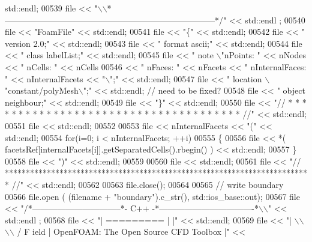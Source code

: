 \begin{DoxyCode}
      std::endl;
00539     file << \textcolor{stringliteral}{"\(\backslash\)\(\backslash\)*---------------------------------------------------------------------------*/"} << std::endl
      ;
00540     file << \textcolor{stringliteral}{"FoamFile"} << std::endl;
00541     file << \textcolor{stringliteral}{"\{"} << std::endl;
00542     file << \textcolor{stringliteral}{"    version     2.0;"} << std::endl;
00543     file << \textcolor{stringliteral}{"    format      ascii;"} << std::endl;
00544     file << \textcolor{stringliteral}{"    class       labelList;"} << std::endl;
00545     file << \textcolor{stringliteral}{"    note        \(\backslash\)"nPoints: "} << nNodes << \textcolor{stringliteral}{" nCells: "} << nCells
00546          << \textcolor{stringliteral}{" nFaces: "} << nFacets << \textcolor{stringliteral}{" nInternalFaces: "} << nInternalFacets << \textcolor{stringliteral}{"\(\backslash\)";"} << std::endl;
00547     file << \textcolor{stringliteral}{"    location    \(\backslash\)"constant/polyMesh\(\backslash\)";"} << std::endl; \textcolor{comment}{// need to be fixed?}
00548     file << \textcolor{stringliteral}{"    object      neighbour;"} << std::endl;
00549     file << \textcolor{stringliteral}{"\}"} << std::endl;
00550     file << \textcolor{stringliteral}{"// * * * * * * * * * * * * * * * * * * * * * * * * * * * * * * * * * * * * * //"} << std::endl;
00551     file << std::endl;
00552 
00553     file << nInternalFacets << \textcolor{stringliteral}{"("} << std::endl;
00554     \textcolor{keywordflow}{for}(i=0; i < nInternalFacets; ++i)
00555     \{
00556         file << *( facetsRef[internalFacets[i]].getSeparatedCells().rbegin() ) << std::endl;
00557     \}
00558     file << \textcolor{stringliteral}{")"} << std::endl;
00559 
00560     file << std::endl;
00561     file << \textcolor{stringliteral}{"// ************************************************************************* //"} << std::endl;
00562 
00563     file.close();
00564 
00565     \textcolor{comment}{// write boundary}
00566     file.open ( (filename + \textcolor{stringliteral}{"boundary"}).c\_str(), std::ios\_base::out);
00567     file << \textcolor{stringliteral}{"/*--------------------------------*- C++ -*----------------------------------*\(\backslash\)\(\backslash\)"} << std::endl
      ;
00568     file << \textcolor{stringliteral}{"| =========                 |                                                 |"} << std::endl;
00569     file << \textcolor{stringliteral}{"| \(\backslash\)\(\backslash\)\(\backslash\)\(\backslash\)      /  F ield         | OpenFOAM: The Open Source CFD Toolbox           |"} << 

\end{DoxyCode}
